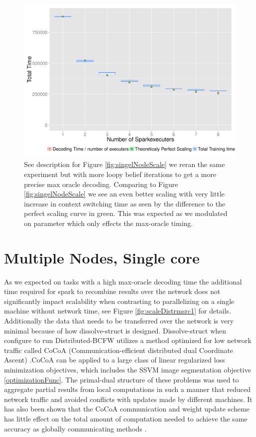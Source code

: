 \begin{figure}
  \centering
  \includegraphics[width=1.0\textwidth]{images/singleMachineScalability_longerDecoding.png}
  \caption{ See description for Figure \ref{fig:singelNodeScale} we reran the same experiment but with more loopy belief iterations to get a more precise max oracle decoding. Comparing to Figure  \ref{fig:singelNodeScale} we see an even better scaling with very little increase in context switching time as seen by the difference to the perfect scaling curve in green. This was expected as we modulated on parameter which only effects the max-oracle timing. } 
  \label{fig:singelNodeScaleLonger}
\end{figure}
\par 

\section{Multiple Nodes, Single core}
As we expected on tasks with a high max-oracle decoding time the additional time required for spark to recombine results over the network does not significantly impact scalability when contrasting to parallelizing on a single machine without network time, see Figure \ref{fig:scaleDistrmsrc1} for details. Additionally the data that needs to be transferred over the network is very minimal because of how dissolve-struct is designed. Dissolve-struct when configure to run Distributed-BCFW utilizes a method optimized for low network traffic called CoCoA (Communication-efficient distributed dual Coordinate Ascent) \cite{cocoa}.CoCoA can be applied to a large class of linear regularized loss minimization objectives, which includes the SSVM image segmentation objective \ref{optimizationFunc}. The primal-dual structure of these problems was used to aggregate partial results from local computations in such a manner that reduced network traffic and avoided conflicts with updates made by different machines. It has also been shown that the CoCoA communication and weight update scheme has little effect on the total amount of computation needed to achieve the same accuracy  as globally communicating methods \cite{cocoa}. 


